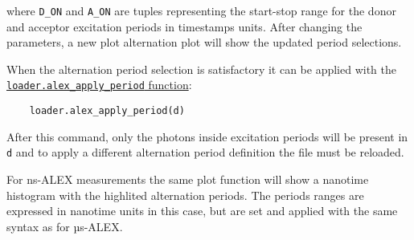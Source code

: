 where \verb|D_ON| and \verb|A_ON| are tuples representing 
the start-stop range for the donor and acceptor excitation periods 
in timestamps units. After changing the parameters, a new plot
alternation plot will show the updated period selections.

When the alternation period selection is satisfactory it can
be applied with the 
\href{http://fretbursts.readthedocs.org/en/latest/loader.html#fretbursts.loader.alex_apply_period}{\texttt{loader.alex\_apply\_period} function}:

\begin{verbatim}
    loader.alex_apply_period(d)
\end{verbatim}

After this command, only the photons inside excitation periods
will be present in \verb|d| and to apply a different alternation 
period definition the file must be reloaded.

For ns-ALEX measurements the same plot function will show
a nanotime histogram with the highlited alternation periods.
The periods ranges are expressed in nanotime units in this case, 
but are set and applied with the same syntax as for µs-ALEX.
